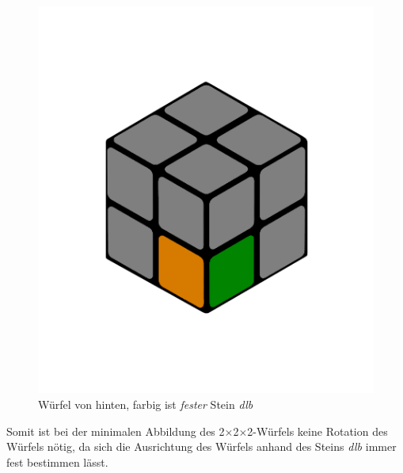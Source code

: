 \documentclass[12pt,a4paper, usenames, dvipsnames]{article}
\theoremstyle{mystyle}
\theoremstyle{definition}
\newcommand{\Gtwo}{\ensuremath{G_{2\times 2\times 2}}}
\newcommand{\Ttwo}{2$\times$2$\times$2-}
\begin{document}
\begin{figure}[H]
\centering
\includegraphics[scale=0.15]{DLB.png}
\caption{Würfel von hinten, farbig ist \textit{fester} Stein \textit{dlb}}
\label{Abbildung_DLB}
\end{figure}

Somit ist bei der minimalen Abbildung des \Ttwo Würfels keine Rotation des Würfels nötig, da sich die Ausrichtung des Würfels anhand des Steins \textit{dlb} immer fest bestimmen lässt.

%
%
%
%
%
%
%
%
%
%
%
%
%
%
%
%
%
%



\end{document}

